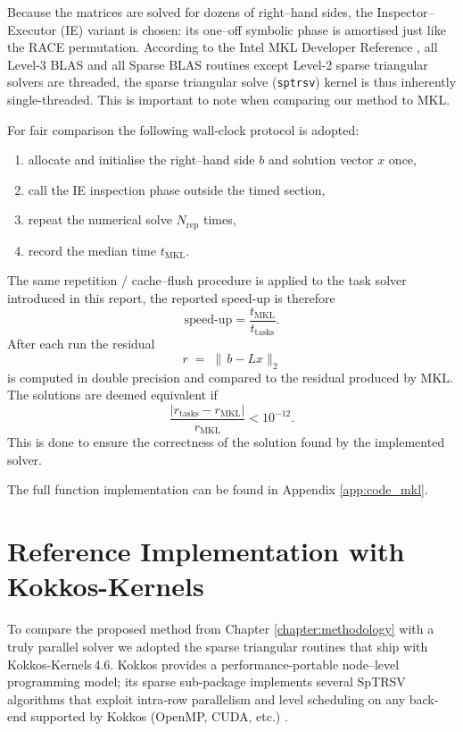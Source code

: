 Because the matrices are solved for dozens of right–hand sides, the
Inspector–Executor (IE) variant is chosen: its one–off symbolic phase
is amortised just like the RACE permutation. According to the Intel MKL Developer Reference \cite{intel_mkl_linux_devguide_2020}, all Level-3 BLAS and all Sparse BLAS routines except Level-2 sparse triangular solvers are threaded, the sparse triangular solve (\texttt{sptrsv}) kernel is thus inherently single-threaded.  This is important to note when comparing our method to MKL.

For fair comparison the following wall‐clock protocol is adopted:
\begin{enumerate}
  \item allocate and initialise the right–hand side $b$ and
        solution vector $x$ once,
  \item call the IE inspection phase
        outside the timed section,
  \item repeat the numerical solve $N_{\mathrm{rep}}$ times,
  \item record the median time $t_{\mathrm{MKL}}$.
\end{enumerate}

The same repetition / cache–flush procedure is applied to the task
solver introduced in this report, the reported speed-up is therefore
$$
  \text{speed-up} =\frac{t_{\mathrm{MKL}}}{t_{\text{tasks}}}.
$$
After each run the residual
$$
  r \;=\;
  \|\,b - Lx\|_2
$$
is computed in double precision and compared to the residual produced
by MKL.  The solutions are deemed equivalent if  
$$
  \frac{\lvert r_{\text{tasks}} - r_{\mathrm{MKL}}\rvert}
       {r_{\mathrm{MKL}}}
  < 10^{-12}.
$$
This is done to ensure the correctness of the solution found by the implemented solver.

The full function implementation can be found in Appendix \ref{app:code_mkl}.
\section{Reference Implementation with Kokkos-Kernels}
\label{sec:impl_kokkos}
To compare the proposed method from Chapter \ref{chapter:methodology} with a truly
parallel solver we adopted the sparse triangular routines that ship
with Kokkos-Kernels\,4.6.  
Kokkos provides a performance-portable node–level programming model;
its sparse sub-package implements several SpTRSV algorithms that
exploit intra‐row parallelism and level scheduling on any back-end
supported by Kokkos (OpenMP, CUDA, etc.) \cite{rajamanickam2021kokkoskernelsperformanceportable}.

